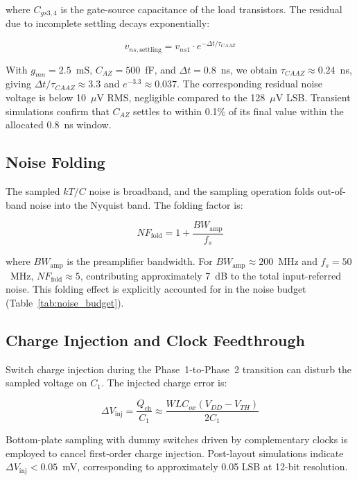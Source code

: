 \documentclass[journal]{IEEEtran}
\begin{document}
where $C_{gs3,4}$ is the gate-source capacitance of the load transistors. The residual due to incomplete settling decays exponentially:

\begin{equation}
v_{ns,\text{settling}} = v_{ns1} \cdot e^{-\Delta t / \tau_{CAAZ}}
\label{eq:settling_residual}
\end{equation}

With $g_{mn}=2.5$~mS, $C_{AZ}=500$~fF, and $\Delta t = 0.8$~ns, we obtain $\tau_{CAAZ}\approx 0.24$~ns, giving $\Delta t/\tau_{CAAZ} \approx 3.3$ and $e^{-3.3} \approx 0.037$. The corresponding residual noise voltage is below 10~$\mu$V RMS, negligible compared to the 128~$\mu$V LSB. Transient simulations confirm that $C_{AZ}$ settles to within 0.1\% of its final value within the allocated 0.8~ns window.

\subsection{Noise Folding}

The sampled $kT/C$ noise is broadband, and the sampling operation folds out-of-band noise into the Nyquist band. The folding factor is:

\begin{equation}
NF_{\text{fold}} = 1 + \frac{BW_{\text{amp}}}{f_s}
\label{eq:folding}
\end{equation}

where $BW_{\text{amp}}$ is the preamplifier bandwidth. For $BW_{\text{amp}} \approx 200$~MHz and $f_s = 50$~MHz, $NF_{\text{fold}} \approx 5$, contributing approximately 7~dB to the total input-referred noise. This folding effect is explicitly accounted for in the noise budget (Table~\ref{tab:noise_budget}).

\subsection{Charge Injection and Clock Feedthrough}

Switch charge injection during the Phase~1-to-Phase~2 transition can disturb the sampled voltage on $C_1$. The injected charge error is:

\begin{equation}
\Delta V_{\text{inj}} = \frac{Q_{\text{ch}}}{C_1} \approx \frac{WLC_{ox}(V_{DD} - V_{TH})}{2C_1}
\label{eq:charge_injection}
\end{equation}

Bottom-plate sampling with dummy switches driven by complementary clocks is employed to cancel first-order charge injection. Post-layout simulations indicate $\Delta V_{\text{inj}} < 0.05$~mV, corresponding to approximately 0.05 LSB at 12-bit resolution.
\end{document}
